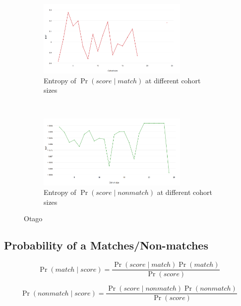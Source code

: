 \begin{figure}[htbp]
    \centering
    \begin{subfigure}[t]{\textwidth}
        \centering
        \includegraphics[width=0.8\textwidth]{dataset/otago/ent_psm}
        \caption{Entropy of $\Pr{(score \mid match)}$ at different cohort sizes}
        \label{fig:otago_ent_psm} %
    \end{subfigure}%
    \\
    \begin{subfigure}[t]{\textwidth}
        \centering
        \includegraphics[width=0.8\textwidth]{dataset/otago/ent_psnm}
        \caption{Entropy of $\Pr{(score \mid nonmatch)}$ at different cohort sizes}
        \label{fig:otago_ent_psnm} %
    \end{subfigure}%
    \caption{Otago}
    \label{fig:otago_entemd} %
\end{figure}

\FloatBarrier%
\subsection{Probability of a Matches/Non-matches}

$$\Pr{(match \mid score)} = \frac{\Pr{(score \mid match)}\Pr{(match)}}
    {\Pr{(score)}}$$

$$\Pr{(nonmatch \mid score)} = \frac{\Pr{(score \mid nonmatch)}\Pr{(nonmatch)}}
    {\Pr{(score)}}$$

